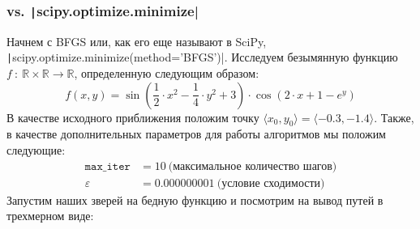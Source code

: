 \documentclass[12pt, a4paper, oneside, final]{article}
\begin{document}
	\subsubsection*{vs. \texttt|scipy.optimize.minimize|}
	Начнем с BFGS или, как его еще называют в SciPy, \texttt|scipy.optimize.minimize(method='BFGS')|.
	Исследуем безымянную функцию $f\ :\ \mathbb{R} \times \mathbb{R} \to \mathbb{R}$, определенную следующим образом:
	\[
		f(x, y) = \sin{\left(\dfrac{1}{2} \cdot x^2 - \dfrac{1}{4} \cdot y^2 + 3\right) \cdot \cos{\left(2 \cdot x + 1 - e^{y}\right)}}
	\]
	В качестве исходного приближения положим точку $\langle x_0, y_0 \rangle = \langle -0.3, -1.4 \rangle$.
	Также, в качестве дополнительных параметров для работы алгоритмов мы положим следующие:
	\begin{align*}
		\mathtt{max\_iter} &= 10~\text{(максимальное количество шагов)} \\
		\varepsilon &= 0.000000001~\text{(условие сходимости)}
	\end{align*}
	Запустим наших зверей на бедную функцию и посмотрим на вывод путей в трехмерном виде:
\end{document}
